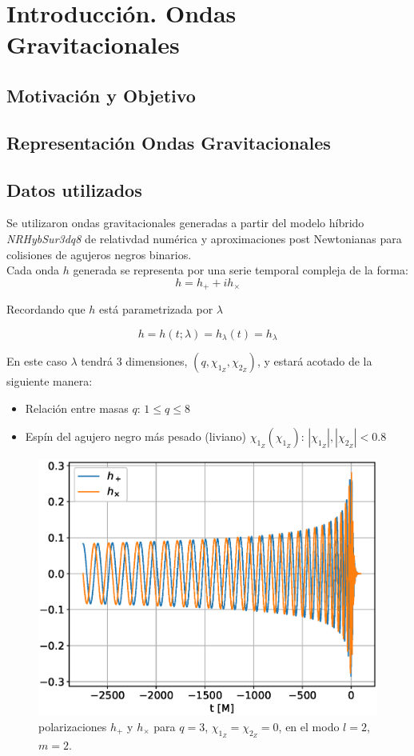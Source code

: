 \chapter{Introducción. Ondas Gravitacionales}

\section{Motivación y Objetivo}
\section{Representación Ondas Gravitacionales}
\section{Datos utilizados}

Se utilizaron ondas gravitacionales generadas a partir del modelo híbrido \textit{NRHybSur3dq8}\cite{Varma_2019} de relativdad numérica y aproximaciones post Newtonianas para colisiones de agujeros negros binarios.
\\

Cada onda \(h\) generada se representa por una serie temporal compleja de la forma:
\[
h = h_+ + ih_{\times}
\]


Recordando que $h$ está parametrizada por \(\lambda\)

 \[h = h(t; \lambda) = h_{\lambda}(t) = h_{\lambda} \]
 
En este caso \(\lambda\) tendrá 3 dimensiones, $(q, \chi_{1_Z},\chi_{2_Z}) $, y estará acotado de la siguiente manera:

\begin{itemize}
\item Relación entre masas $q$: $1 \le q \le 8$
\item Espín del agujero negro más pesado (liviano) $\chi_{1_Z} (\chi_{1_Z})$: $|\chi_{1_Z}|, |\chi_{2_Z}| < 0.8$
\end{itemize}

\begin{figure}[h]
\centering
\includegraphics[width=.9\columnwidth]{figs/h_l2m2_q3.eps}
\caption{polarizaciones \(h_+\) y \(h_{\times}\) para $q = 3$, $\chi_{1_Z} = \chi_{2_Z} = 0$, en el modo $l=2$, $m=2$.}
\label{fig:h_q3}
\end{figure}




